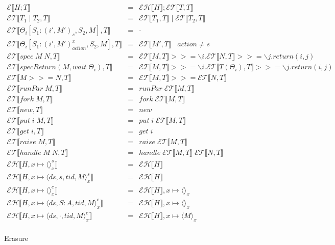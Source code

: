 \documentclass[9pt]{article}
\newcommand{\erase}[1]{\mathcal{E}\llbracket #1 \rrbracket}
\newcommand{\eraseThreads}[2]{\mathcal{ET}\llbracket #1, #2 \rrbracket}
\newcommand{\eraseHeap}[1]{\mathcal{EH}\llbracket #1 \rrbracket}
\begin{document}
\begin{figure}[H]
\centering

\begin{displaymath}
\begin{array}{rcll}
\erase{H; T} &=& \eraseHeap{H}; \eraseThreads{T}{T} \\
\eraseThreads{T_1 \; | \; T_2}{T} &=& \eraseThreads{T_1}{ T} \; | \; \eraseThreads{T_2}{ T} \\
\eraseThreads{\Theta_i[S_1 : (i', M')_s, S_2, M]}{T} &=& \cdot \\
\eraseThreads{\Theta_i[S_1 : (i', M')_{action}^x, S_2, M]}{T} &=& \eraseThreads{M'}{T} \;\;\; action \neq s\\

\eraseThreads{ spec \; M \; N}{T} &=& \eraseThreads{M}{T} >>= \backslash i . \eraseThreads{N}{T} >>= \backslash j. return(i, j) \\
\eraseThreads{specReturn(M, wait \; \Theta_i)}{T} &=& \eraseThreads{M}{T} >>= \backslash i. \eraseThreads{T(\Theta_i)}{T} >>= \backslash j. return(i, j) \\
\eraseThreads{M >>= N}{T} &=& \eraseThreads{M}{T} >>= \eraseThreads{N}{T}\\
\eraseThreads{runPar \; M}{T} &=& runPar \; \eraseThreads{M}{T} \\
\eraseThreads{fork \; M}{T} &=& fork \; \eraseThreads{M}{T} \\
\eraseThreads{new}{T} &=& new \\
\eraseThreads{put \; i \; M}{T} &=& put \; i \; \eraseThreads{M}{T} \\
\eraseThreads{get \; i}{T} &=& get \; i \\
\eraseThreads{raise \; M}{T} &=& raise \; \eraseThreads{M}{T} \\
\eraseThreads{handle \; M \; N}{T} &=& handle \; \eraseThreads{M}{T} \; \eraseThreads{N}{T}  \\

\eraseHeap{H, x \mapsto \langle\rangle_x^s} &=& \eraseHeap{H} \\
\eraseHeap{H, x \mapsto \langle ds, s, tid, M\rangle_x^s} &=& \eraseHeap{H} \\
\eraseHeap{H, x \mapsto \langle\rangle_x^c} &=& \eraseHeap{H}, x\mapsto \langle\rangle_x \\
\eraseHeap{H, x\mapsto \langle ds, S : A, tid, M\rangle_x^c} &=& \eraseHeap{H}, x \mapsto \langle\rangle_x \\
\eraseHeap{H, x \mapsto \langle ds, \cdot, tid, M\rangle_x^c} &=& \eraseHeap{H}, x \mapsto \langle M\rangle_x \\
\end{array}
\end{displaymath}
\caption{Erasure}
\end{figure}
\end{document}
